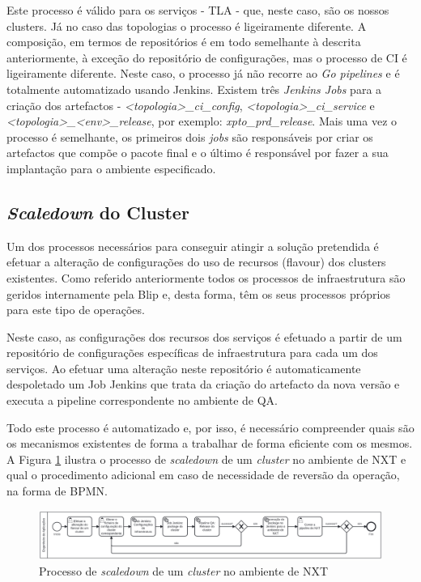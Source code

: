 Este processo é válido para os serviços - \ac{TLA} - que, neste caso, são os nossos \glspl{cluster}.
Já no caso das topologias o processo é ligeiramente diferente. A composição, em termos de 
repositórios é em todo semelhante à descrita anteriormente, à exceção do repositório de configurações,
mas o processo de \ac{CI} é ligeiramente diferente. Neste caso, o processo já não recorre ao 
\textit{Go pipelines} e é totalmente automatizado usando Jenkins. Existem três \textit{Jenkins Jobs} 
para a criação dos artefactos - \textit{<topologia>\_ci\_config}, \textit{<topologia>\_ci\_service}
e \textit{<topologia>\_<env>\_release}, por exemplo: \textit{xpto\_prd\_release}. Mais uma vez o 
processo é semelhante, os primeiros dois \textit{jobs} são responsáveis por criar os artefactos 
que compõe o pacote final e o último é responsável por fazer a sua implantação para o ambiente 
especificado.

\subsection{\textit{Scaledown} do Cluster}

Um dos processos necessários para conseguir atingir a solução pretendida é efetuar a alteração
de configurações do uso de recursos (\gls{flavour}) dos \glspl{cluster} existentes. Como
referido anteriormente todos os processos de infraestrutura são geridos internamente pela Blip e,
desta forma, têm os seus processos próprios para este tipo de operações.

Neste caso, as configurações dos recursos dos serviços é efetuado a partir de um repositório 
de configurações específicas de infraestrutura para cada um dos serviços. Ao efetuar uma alteração
neste repositório é automaticamente despoletado um Job Jenkins que trata da criação do artefacto
da nova versão e executa a \gls{pipeline} correspondente no ambiente de \ac{QA}.

Todo este processo é automatizado e, por isso, é necessário compreender quais são os mecanismos
existentes de forma a trabalhar de forma eficiente com os mesmos. A Figura \ref{scaledown-nxt} 
ilustra o processo de \textit{scaledown} de um \textit{cluster} no ambiente de NXT e qual o 
procedimento adicional em caso de necessidade de reversão da operação, na forma de \ac{BPMN}.

\begin{figure}[H]
  \centerline{\includegraphics[scale=0.11]{media/content/impl/scaledown_nxt.png}}
  \caption{Processo de \textit{scaledown} de um \textit{cluster} no ambiente de NXT}
  \label{scaledown-nxt}
\end{figure}

